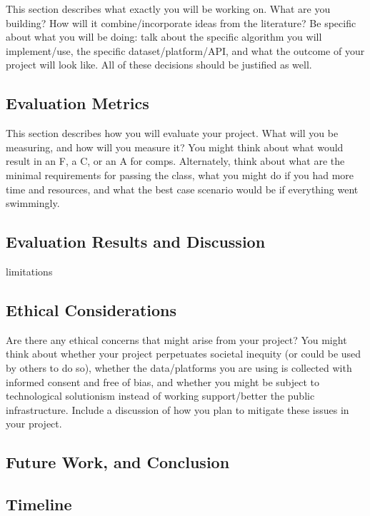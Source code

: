 \documentclass[10pt,twocolumn]{article}
\begin{document}
This section describes what exactly you will be working on.
What are you building? How will it combine/incorporate ideas from the literature? Be specific about what you will be doing: talk about the specific algorithm you will implement/use, the specific dataset/platform/API, and what the outcome of your project will look like.
All of these decisions should be justified as well.



\subsection{Evaluation Metrics}

This section describes how you will evaluate your project.
What will you be measuring, and how will you measure it?
You might think about what would result in an F, a C, or an A for comps.
Alternately, think about what are the minimal requirements for passing the class, what you might do if you had more time and resources, and what the best case scenario would be if everything went swimmingly.

\subsection{Evaluation Results and Discussion}

limitations

\subsection{Ethical Considerations}

Are there any ethical concerns that might arise from your project?
You might think about whether your project perpetuates societal inequity (or could be used by others to do so), whether the data/platforms you are using is collected with informed consent and free of bias, and whether you might be subject to technological solutionism instead of working support/better the public infrastructure.
Include a discussion of how you plan to mitigate these issues in your project.

\subsection{Future Work, and Conclusion}

\subsection{Timeline}
\end{document}
